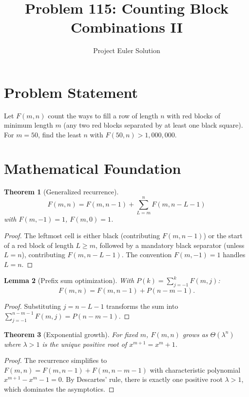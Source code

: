 \documentclass[12pt]{article}
\title{Problem 115: Counting Block Combinations II}
\author{Project Euler Solution}
\date{}
\newtheorem{theorem}{Theorem}
\newtheorem{lemma}[theorem]{Lemma}
\begin{document}
\maketitle

\section{Problem Statement}

Let $F(m, n)$ count the ways to fill a row of length $n$ with red blocks of minimum length $m$ (any two red blocks separated by at least one black square). For $m = 50$, find the least $n$ with $F(50, n) > 1{,}000{,}000$.

\section{Mathematical Foundation}

\begin{theorem}[Generalized recurrence]
\[
F(m, n) = F(m, n-1) + \sum_{L=m}^{n} F(m, n - L - 1)
\]
with $F(m, -1) = 1$, $F(m, 0) = 1$.
\end{theorem}

\begin{proof}
The leftmost cell is either black (contributing $F(m, n-1)$) or the start of a red block of length $L \ge m$, followed by a mandatory black separator (unless $L = n$), contributing $F(m, n - L - 1)$. The convention $F(m, -1) = 1$ handles $L = n$.
\end{proof}

\begin{lemma}[Prefix sum optimization]
With $P(k) = \sum_{j=-1}^{k} F(m, j)$:
\[
F(m, n) = F(m, n-1) + P(n - m - 1).
\]
\end{lemma}

\begin{proof}
Substituting $j = n - L - 1$ transforms the sum into $\sum_{j=-1}^{n-m-1} F(m, j) = P(n-m-1)$.
\end{proof}

\begin{theorem}[Exponential growth]
For fixed $m$, $F(m, n)$ grows as $\Theta(\lambda^n)$ where $\lambda > 1$ is the unique positive root of $x^{m+1} = x^m + 1$.
\end{theorem}

\begin{proof}
The recurrence simplifies to $F(m,n) = F(m,n-1) + F(m,n-m-1)$ with characteristic polynomial $x^{m+1} - x^m - 1 = 0$. By Descartes' rule, there is exactly one positive root $\lambda > 1$, which dominates the asymptotics.
\end{proof}
\end{document}
